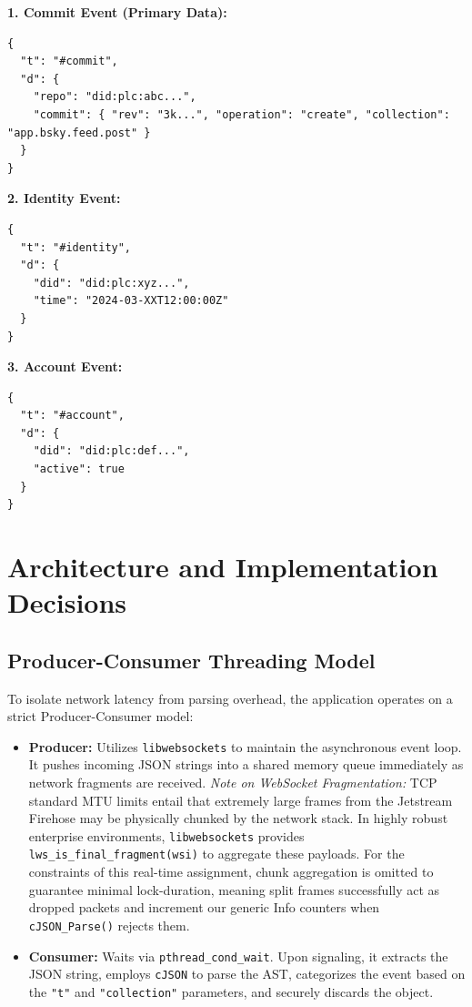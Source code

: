 \documentclass[12pt,a4paper]{article}
\begin{document}
\textbf{1. Commit Event (Primary Data):}
\begin{verbatim}
{
  "t": "#commit",
  "d": {
    "repo": "did:plc:abc...",
    "commit": { "rev": "3k...", "operation": "create", "collection": "app.bsky.feed.post" }
  }
}
\end{verbatim}

\textbf{2. Identity Event:}
\begin{verbatim}
{
  "t": "#identity",
  "d": {
    "did": "did:plc:xyz...",
    "time": "2024-03-XXT12:00:00Z"
  }
}
\end{verbatim}
\newpage
\textbf{3. Account Event:}
\begin{verbatim}
{
  "t": "#account",
  "d": {
    "did": "did:plc:def...",
    "active": true
  }
}
\end{verbatim}

\section{Architecture and Implementation Decisions}

\subsection{Producer-Consumer Threading Model}
To isolate network latency from parsing overhead, the application operates on a strict Producer-Consumer model:
\begin{itemize}
    \item \textbf{Producer:} Utilizes \texttt{libwebsockets} to maintain the asynchronous event loop. It pushes incoming JSON strings into a shared memory queue immediately as network fragments are received. 
    \textit{Note on WebSocket Fragmentation:} TCP standard MTU limits entail that extremely large frames from the Jetstream Firehose may be physically chunked by the network stack. In highly robust enterprise environments, \texttt{libwebsockets} provides \texttt{lws\_is\_final\_fragment(wsi)} to aggregate these payloads. For the constraints of this real-time assignment, chunk aggregation is omitted to guarantee minimal lock-duration, meaning split frames successfully act as dropped packets and increment our generic Info counters when \texttt{cJSON\_Parse()} rejects them.
    \item \textbf{Consumer:} Waits via \texttt{pthread\_cond\_wait}. Upon signaling, it extracts the JSON string, employs \texttt{cJSON} to parse the AST, categorizes the event based on the \texttt{"t"} and \texttt{"collection"} parameters, and securely discards the object.
\end{itemize}
\end{document}
